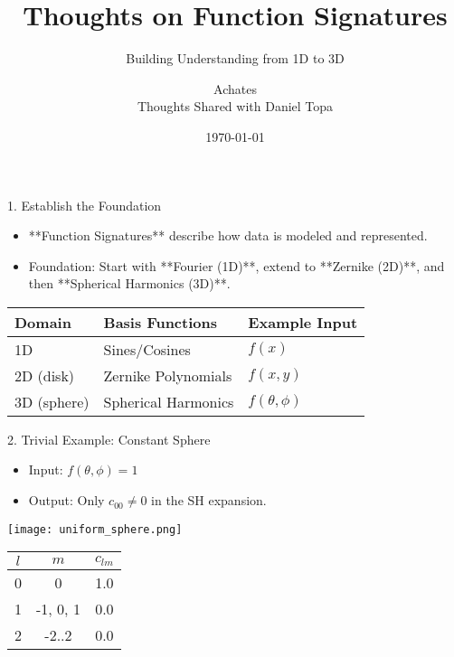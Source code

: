 \documentclass{beamer}
\title{Thoughts on Function Signatures}
\subtitle{Building Understanding from 1D to 3D}
\author{Achates \\ \small{Thoughts Shared with Daniel Topa}}
\date{\today}
\begin{document}
\begin{frame}{1. Establish the Foundation}
    \begin{itemize}
        \item **Function Signatures** describe how data is modeled and represented.
        \item Foundation: Start with **Fourier (1D)**, extend to **Zernike (2D)**, and then **Spherical Harmonics (3D)**.
    \end{itemize}
    \vspace{0.3cm}
    \begin{center}
        \begin{tabular}{|l|l|l|}
            \hline
            \textbf{Domain} & \textbf{Basis Functions} & \textbf{Example Input} \\
            \hline
            1D              & Sines/Cosines           & \( f(x) \) \\
            2D (disk)       & Zernike Polynomials     & \( f(x, y) \) \\
            3D (sphere)     & Spherical Harmonics     & \( f(\theta, \phi) \) \\
            \hline
        \end{tabular}
    \end{center}
\end{frame}

\begin{frame}{2. Trivial Example: Constant Sphere}
    \begin{itemize}
        \item Input: \( f(\theta, \phi) = 1 \)
        \item Output: Only \( c_{00} \neq 0 \) in the SH expansion.
    \end{itemize}
    \vspace{0.3cm}
    \begin{center}
        \texttt{[image: uniform\_sphere.png]} %
    \end{center}
    \vspace{0.3cm}
    \begin{tabular}{|c|c|c|}
        \hline
        \( l \) & \( m \) & \( c_{lm} \) \\
        \hline
        0       & 0       & 1.0         \\
        1       & -1, 0, 1 & 0.0        \\
        2       & -2..2   & 0.0         \\
        \hline
    \end{tabular}
\end{frame}
\end{document}
